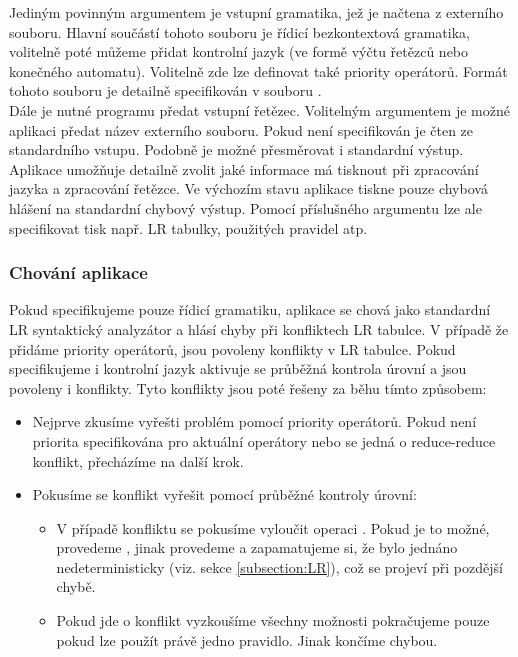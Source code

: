 Jediným povinným argumentem je vstupní gramatika, jež je načtena z
externího souboru. Hlavní součástí tohoto souboru je řídicí bezkontextová gramatika,
volitelně poté můžeme přidat kontrolní jazyk
(ve formě výčtu řetězců nebo konečného automatu).
Volitelně zde lze definovat také priority operátorů.
Formát tohoto souboru je detailně specifikován v souboru .\\

Dále je nutné programu předat vstupní řetězec. Volitelným argumentem je
možné aplikaci předat název externího souboru. Pokud není specifikován
je čten ze standardního vstupu. Podobně je možné přesměrovat i standardní
výstup.\\

Aplikace umožňuje detailně zvolit jaké informace má tisknout
při zpracování jazyka a zpracování řetězce. Ve výchozím stavu
aplikace tiskne pouze chybová hlášení na standardní chybový výstup.
Pomocí příslušného argumentu lze ale specifikovat tisk např. LR tabulky,
použitých pravidel atp.\\

\subsubsection*{Chování aplikace}

Pokud specifikujeme pouze řídicí gramatiku, aplikace se chová jako
standardní LR syntaktický analyzátor a hlásí chyby při konfliktech LR tabulce.
V případě že přidáme priority operátorů, jsou povoleny 
konflikty v LR tabulce. Pokud specifikujeme i kontrolní jazyk aktivuje se
průběžná kontrola úrovní a jsou povoleny  i
 konflikty. Tyto konflikty jsou poté
řešeny za běhu tímto způsobem:

\begin{itemize}
  \item Nejprve zkusíme vyřešti problém pomocí priority operátorů.
    Pokud není priorita specifikována pro aktuální operátory nebo se jedná o
    reduce-reduce konflikt, přecházíme na další krok.

  \item Pokusíme se konflikt vyřešit pomocí průběžné kontroly úrovní:
  \begin{itemize}
    \item V případě  konfliktu se pokusíme vyloučit operaci
      . Pokud je to možné, provedeme , jinak
      provedeme  a zapamatujeme si, že bylo jednáno
      nedeterministicky (viz. sekce \ref{subsection:LR}), což se projeví při pozdější chybě.
    \item Pokud jde o  konflikt vyzkoušíme všechny možnosti
      pokračujeme pouze pokud lze použít právě jedno pravidlo. Jinak končíme
      chybou.
  \end{itemize}
\end{itemize}

